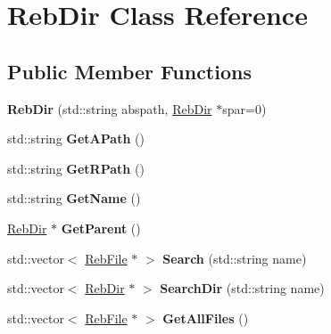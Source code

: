 \hypertarget{class_reb_dir}{}\section{Reb\+Dir Class Reference}
\label{class_reb_dir}
\subsection*{Public Member Functions}
\begin{DoxyCompactItemize}
\item 
{\bfseries Reb\+Dir} (std\+::string abspath, \hyperlink{class_reb_dir}{Reb\+Dir} $\ast$spar=0)\hypertarget{class_reb_dir_af8d3ec742eeb3ec17bfb12e48884e025}{}\label{class_reb_dir_af8d3ec742eeb3ec17bfb12e48884e025}

\item 
std\+::string {\bfseries Get\+A\+Path} ()\hypertarget{class_reb_dir_a4e847c42a670ad41fb8e93f306f8ac00}{}\label{class_reb_dir_a4e847c42a670ad41fb8e93f306f8ac00}

\item 
std\+::string {\bfseries Get\+R\+Path} ()\hypertarget{class_reb_dir_a84e3c3c19b084bfd5cdba0f61f92d489}{}\label{class_reb_dir_a84e3c3c19b084bfd5cdba0f61f92d489}

\item 
std\+::string {\bfseries Get\+Name} ()\hypertarget{class_reb_dir_a1e34602e5b1e0f5aece2609c83b2c4c4}{}\label{class_reb_dir_a1e34602e5b1e0f5aece2609c83b2c4c4}

\item 
\hyperlink{class_reb_dir}{Reb\+Dir} $\ast$ {\bfseries Get\+Parent} ()\hypertarget{class_reb_dir_af9c0f3eacc112abecf0fbb5eefc82256}{}\label{class_reb_dir_af9c0f3eacc112abecf0fbb5eefc82256}

\item 
std\+::vector$<$ \hyperlink{class_reb_file}{Reb\+File} $\ast$ $>$ {\bfseries Search} (std\+::string name)\hypertarget{class_reb_dir_a1fa4025217b3f6decaf372fb9e55cc38}{}\label{class_reb_dir_a1fa4025217b3f6decaf372fb9e55cc38}

\item 
std\+::vector$<$ \hyperlink{class_reb_dir}{Reb\+Dir} $\ast$ $>$ {\bfseries Search\+Dir} (std\+::string name)\hypertarget{class_reb_dir_ab39ddb099bf247cfafc56f1a08c472ff}{}\label{class_reb_dir_ab39ddb099bf247cfafc56f1a08c472ff}

\item 
std\+::vector$<$ \hyperlink{class_reb_file}{Reb\+File} $\ast$ $>$ {\bfseries Get\+All\+Files} ()\hypertarget{class_reb_dir_a041db1c6010708c0c892265224497c33}{}\label{class_reb_dir_a041db1c6010708c0c892265224497c33}


\end{DoxyCompactItemize}
